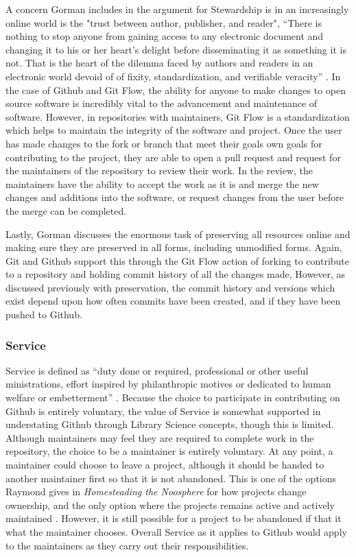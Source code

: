 A concern Gorman includes in the argument for Stewardship is in an increasingly online world is the "trust between author, publisher, and reader", “There is nothing to stop anyone from gaining access to any electronic document and changing it to his or her heart’s delight before disseminating it as something it is not. That is the heart of the dilemma faced by authors and readers in an electronic world devoid of of fixity, standardization, and verifiable veracity” \cite{gorman2000values}. In the case of Github and Git Flow, the ability for anyone to make changes to open source software is incredibly vital to the advancement and maintenance of software. However, in repositories with maintainers, Git Flow is a standardization which helps to maintain the integrity of the software and project. Once the user has made changes to the fork or branch that meet their goals own goals for contributing to the project, they are able to open a pull request and request for the maintainers of the repository to review their work. In the review, the maintainers have the ability to accept the work as it is and merge the new changes and additions into the software, or request changes from the user before the merge can be completed.

Lastly, Gorman discusses the enormous task of preserving all resources online and making sure they are preserved in all forms, including unmodified forms. Again, Git and Github support this through the Git Flow action of forking to contribute to a repository and holding commit history of all the changes made, However, as discussed previously with preservation, the commit history and versions which exist depend upon how often commits have been created, and if they have been pushed to Github. 

\subsubsection{Service}

Service is defined as  “duty done or required, professional or other useful ministrations, effort inspired by philanthropic motives or dedicated to human welfare or embetterment” \cite{gorman2000values}. Because the choice to participate in contributing on Github is entirely voluntary, the value of Service is somewhat supported in understating Github through Library Science concepts, though this is limited. Although maintainers may feel they are required to complete work in the repository, the choice to be a maintainer is entirely voluntary. At any point, a maintainer could choose to leave a project, although it should be handed to another maintainer first so that it is not abandoned. This is one of the options Raymond gives in \textit{Homesteading the Noosphere} for how projects change ownership, and the only option where the projects remains active and actively maintained \cite{raymondnoosphere}. However, it is still possible for a project to be abandoned if that it what the maintainer chooses. Overall Service as it applies to Github would apply to the maintainers as they carry out their responsibilities. 



